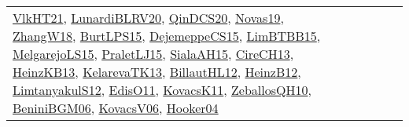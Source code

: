 {\begin{longtable}{llp{6cm}p{6cm}p{6cm}}
\href{articles/VlkHT21.pdf}{VlkHT21}\cite{VlkHT21}, \href{articles/LunardiBLRV20.pdf}{LunardiBLRV20}\cite{LunardiBLRV20}, \href{articles/QinDCS20.pdf}{QinDCS20}\cite{QinDCS20}, \href{articles/Novas19.pdf}{Novas19}\cite{Novas19}, \href{articles/ZhangW18.pdf}{ZhangW18}\cite{ZhangW18}, \href{papers/BurtLPS15.pdf}{BurtLPS15}\cite{BurtLPS15}, \href{papers/DejemeppeCS15.pdf}{DejemeppeCS15}\cite{DejemeppeCS15}, \href{papers/LimBTBB15.pdf}{LimBTBB15}\cite{LimBTBB15}, \href{papers/MelgarejoLS15.pdf}{MelgarejoLS15}\cite{MelgarejoLS15}, \href{papers/PraletLJ15.pdf}{PraletLJ15}\cite{PraletLJ15}, \href{papers/SialaAH15.pdf}{SialaAH15}\cite{SialaAH15}, \href{papers/CireCH13.pdf}{CireCH13}\cite{CireCH13}, \href{papers/HeinzKB13.pdf}{HeinzKB13}\cite{HeinzKB13}, \href{papers/KelarevaTK13.pdf}{KelarevaTK13}\cite{KelarevaTK13}, \href{papers/BillautHL12.pdf}{BillautHL12}\cite{BillautHL12}, \href{papers/HeinzB12.pdf}{HeinzB12}\cite{HeinzB12}, \href{articles/LimtanyakulS12.pdf}{LimtanyakulS12}\cite{LimtanyakulS12}, \href{papers/EdisO11.pdf}{EdisO11}\cite{EdisO11}, \href{articles/KovacsK11.pdf}{KovacsK11}\cite{KovacsK11}, \href{articles/ZeballosQH10.pdf}{ZeballosQH10}\cite{ZeballosQH10}, \href{papers/BeniniBGM06.pdf}{BeniniBGM06}\cite{BeniniBGM06}, \href{papers/KovacsV06.pdf}{KovacsV06}\cite{KovacsV06}, \href{papers/Hooker04.pdf}{Hooker04}\cite{Hooker04}\\

\end{longtable}}
